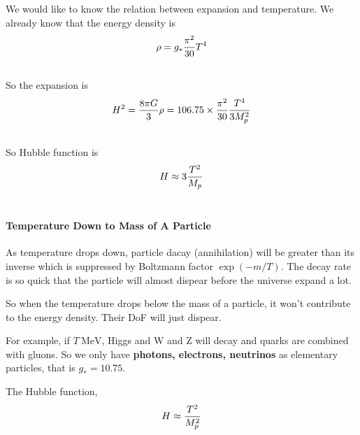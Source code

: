 \documentclass[letterpaper,10pt,english]{sphinxmanual}
\begin{document}
{We would like to know the relation between expansion and temperature. We already know that the energy density is
\begin{gather}
\begin{split}\rho = g _ * \frac{\pi^2}{30} T^4\end{split}\notag\\\begin{split}\end{split}\notag
\end{gather}
So the expansion is
\begin{gather}
\begin{split}H^2 = \frac{8\pi G}{3}\rho = 106.75 \times \frac{\pi^2}{30} \frac{T^4}{3 M_p^2}\end{split}\notag\\\begin{split}\end{split}\notag
\end{gather}
So Hubble function is
\begin{gather}
\begin{split}H \approx 3 \frac{T^2}{M_p}\end{split}\notag\\\begin{split}\end{split}\notag
\end{gather}

\paragraph{Temperature Down to Mass of A Particle}
\label{Cosmology/cosmoIndex:temperature-down-to-mass-of-a-particle}
As temperature drops down, particle dacay (annihilation) will be greater than its inverse which is suppressed by Boltzmann factor $\exp (-m/T)$. The decay rate is so quick that the particle will almost dispear before the universe expand a lot.

So when the temperature drops below the mass of a particle, it won't contribute to the energy density. Their DoF will just dispear.

For example, if $T~\mathrm{MeV}$, Higgs and W and Z will decay and quarks are combined with gluons. So we only have \textbf{photons, electrons, neutrinos} as elementary particles, that is $g_* = 10.75$.

The Hubble function,
\begin{gather}
\begin{split}H \approx \frac{T^2}{M _ p ^2}\end{split}\notag\\\begin{split}\end{split}\notag
\end{gather}

}
\end{document}
